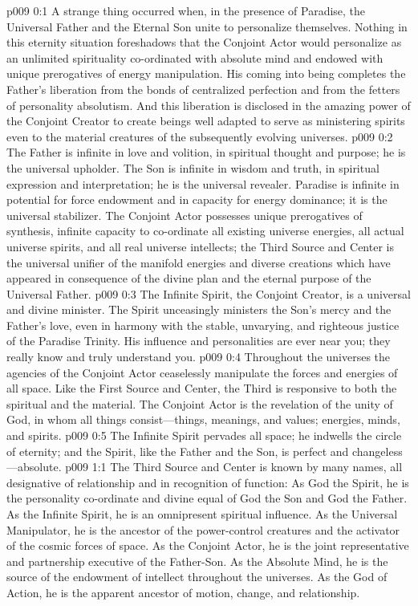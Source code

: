 \author{Divine Counselor}
\vs p009 0:1 A strange thing occurred when, in the presence of Paradise, the Universal Father and the Eternal Son unite to personalize themselves. Nothing in this eternity situation foreshadows that the Conjoint Actor would personalize as an unlimited spirituality co\hyp{}ordinated with absolute mind and endowed with unique prerogatives of energy manipulation. His coming into being completes the Father’s liberation from the bonds of centralized perfection and from the fetters of personality absolutism. And this liberation is disclosed in the amazing power of the Conjoint Creator to create beings well adapted to serve as ministering spirits even to the material creatures of the subsequently evolving universes.
\pc \vs p009 0:2 The Father is infinite in love and volition, in spiritual thought and purpose; he is the universal upholder. The Son is infinite in wisdom and truth, in spiritual expression and interpretation; he is the universal revealer. Paradise is infinite in potential for force endowment and in capacity for energy dominance; it is the universal stabilizer. The Conjoint Actor possesses unique prerogatives of synthesis, infinite capacity to co\hyp{}ordinate all existing universe energies, all actual universe spirits, and all real universe intellects; the Third Source and Center is the universal unifier of the manifold energies and diverse creations which have appeared in consequence of the divine plan and the eternal purpose of the Universal Father.
\vs p009 0:3 The Infinite Spirit, the Conjoint Creator, is a universal and divine minister. The Spirit unceasingly ministers the Son’s mercy and the Father’s love, even in harmony with the stable, unvarying, and righteous justice of the Paradise Trinity. His influence and personalities are ever near you; they really know and truly understand you.
\vs p009 0:4 Throughout the universes the agencies of the Conjoint Actor ceaselessly manipulate the forces and energies of all space. Like the First Source and Center, the Third is responsive to both the spiritual and the material. The Conjoint Actor is the revelation of the unity of God, in whom all things consist---things, meanings, and values; energies, minds, and spirits.\plusone
\pc \vs p009 0:5 The Infinite Spirit pervades all space; he indwells the circle of eternity; and the Spirit, like the Father and the Son, is perfect and changeless---absolute.
\vs p009 1:1 The Third Source and Center is known by many names, all designative of relationship and in recognition of function: As God the Spirit, he is the personality co\hyp{}ordinate and divine equal of God the Son and God the Father. As the Infinite Spirit, he is an omnipresent spiritual influence. As the Universal Manipulator, he is the ancestor of the power\hyp{}control creatures and the activator of the cosmic forces of space. As the Conjoint Actor, he is the joint representative and partnership executive of the Father\hyp{}Son. As the Absolute Mind, he is the source of the endowment of intellect throughout the universes. As the God of Action, he is the apparent ancestor of motion, change, and relationship.
